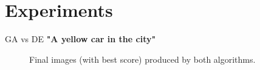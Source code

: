 \documentclass[t]{beamer}
\begin{document}
\section{Experiments}

\begin{frame}{GA vs DE}
\centering
\textbf{"A yellow car in the city"}
\begin{figure}[h]
    \centering
    \qquad
    \caption{Final images (with best score) produced by both algorithms.}
\end{figure}
\end{frame}
\end{document}
